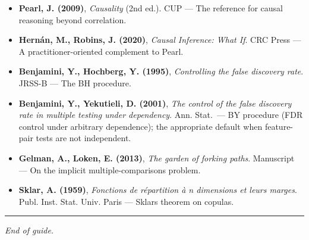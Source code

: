 \documentclass{article}
\providecommand{\tightlist}{\setlength{\itemsep}{0pt}\setlength{\parskip}{0pt}}
\begin{document}
\begin{itemize}
\tightlist
\item
  \textbf{Pearl, J. (2009)}, \emph{Causality} (2nd ed.). CUP --- The
  reference for causal reasoning beyond correlation.
\item
  \textbf{Hernán, M., Robins, J. (2020)}, \emph{Causal Inference: What
  If}. CRC Press --- A practitioner-oriented complement to Pearl.
\item
  \textbf{Benjamini, Y., Hochberg, Y. (1995)}, \emph{Controlling the
  false discovery rate}. JRSS-B --- The BH procedure.
\item
  \textbf{Benjamini, Y., Yekutieli, D. (2001)}, \emph{The control of
  the false discovery rate in multiple testing under dependency}. Ann.
  Stat.\ --- BY procedure (FDR control under arbitrary dependence);
  the appropriate default when feature-pair tests are not independent.
\item
  \textbf{Gelman, A., Loken, E. (2013)}, \emph{The garden of forking
  paths}. Manuscript --- On the implicit multiple-comparisons problem.
\item
  \textbf{Sklar, A. (1959)}, \emph{Fonctions de répartition à n
  dimensions et leurs marges}. Publ. Inst. Stat. Univ. Paris ---
  Sklar\textquotesingle s theorem on copulas.
\end{itemize}

\begin{center}\rule{0.5\linewidth}{0.5pt}\end{center}

\emph{End of guide.}
\end{document}
